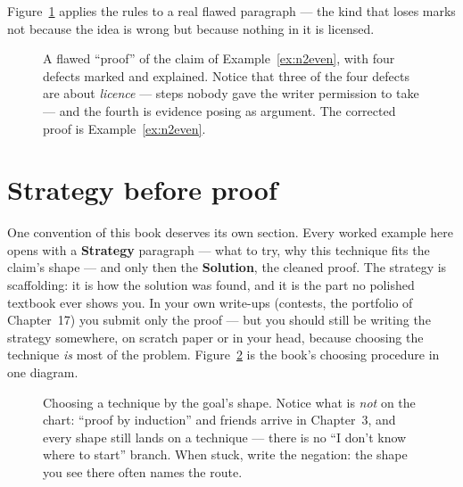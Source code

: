 Figure~\ref{fig:markup} applies the rules to a real flawed paragraph --- the
kind that loses marks not because the idea is wrong but because nothing in it
is licensed.

\begin{figure}[ht]\centering

\caption{A flawed ``proof'' of the claim of Example~\ref{ex:n2even}, with four
defects marked and explained. Notice that three of the four defects are about
\emph{licence} --- steps nobody gave the writer permission to take --- and the
fourth is evidence posing as argument. The corrected proof is
Example~\ref{ex:n2even}.}
\label{fig:markup}
\end{figure}

\section{Strategy before proof}\label{sec:strategyfirst}

One convention of this book deserves its own section. Every worked example here
opens with a \textbf{Strategy} paragraph --- what to try, why this technique
fits the claim's shape --- and only then the \textbf{Solution}, the cleaned
proof. The strategy is scaffolding: it is how the solution was found, and it is
the part no polished textbook ever shows you. In your own write-ups (contests,
the portfolio of Chapter~17) you submit only the proof --- but you should still
be writing the strategy somewhere, on scratch paper or in your head, because
choosing the technique \emph{is} most of the problem. Figure~\ref{fig:flowchart}
is the book's choosing procedure in one diagram.

\begin{figure}[ht]\centering

\caption{Choosing a technique by the goal's shape. Notice what is \emph{not} on
the chart: ``proof by induction'' and friends arrive in Chapter~3, and every
shape still lands on a technique --- there is no ``I don't know where to start''
branch. When stuck, write the negation: the shape you see there often names the
route.}
\label{fig:flowchart}
\end{figure}

